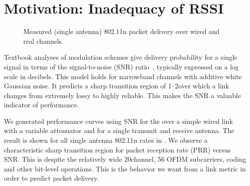 \section{Motivation: Inadequacy of RSSI}
\begin{figure}[t]
	\centering
\hfill%
\hfill%
\hfill%
	\caption[Packet delivery over wired and real 802.11 channels]{\label{fig:rssi_predictions}Measured (single antenna) 802.11n packet delivery over wired and real channels.}%
\end{figure}
Textbook analyses of modulation schemes give delivery probability for a single signal in terms of the signal-to-noise (SNR) ratio~\cite{Goldsmith}, %
typically expressed on a log scale in decibels.
This model holds for narrowband channels with additive white Gaussian noise. It predicts a sharp transition region of 1--2\dB over which a link changes from extremely lossy to highly reliable. This makes the SNR a valuable indicator of performance.

We generated performance curves using SNR for the  over a simple wired link with a variable attenuator and for a single transmit and receive antenna. The result is shown for all single antenna 802.11n rates in . 
We observe a characteristic sharp transition region for packet reception rate (PRR) versus SNR\@. This is despite the relatively wide 20\MHz channel, 56 OFDM subcarriers, coding and other bit-level operations. This is the behavior we want from a link metric in order to predict packet delivery.

